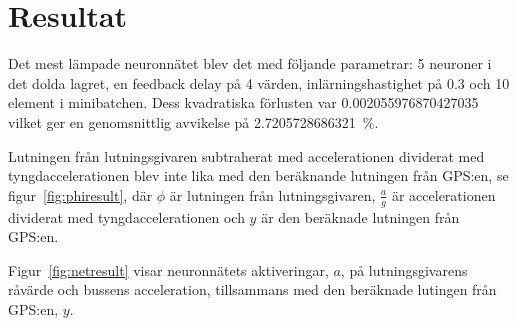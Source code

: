 \section{Resultat}

Det mest lämpade neuronnätet blev det med följande parametrar:
\SI{5}{\styck} neuroner i det dolda lagret, en feedback delay på \SI{4}{\styck} värden,
inlärningshastighet på \num{0.3} och \SI{10}{\styck} element i minibatchen.
Dess kvadratiska förlusten var \num[round-precision=3]{0.002055976870427035}
vilket ger en genomsnittlig avvikelse på
\SI[round-precision=3]{2.7205728686321}{\percent}.

Lutningen från lutningsgivaren subtraherat med accelerationen dividerat med tyngdaccelerationen
blev inte lika med den beräknande lutningen från GPS:en, se figur~\ref{fig:phiresult},
där $\phi$ är lutningen från lutningsgivaren,
$\frac{a}{g}$ är accelerationen dividerat med tyngdaccelerationen
och $y$ är den beräknade lutningen från GPS:en.

\begin{sidewaysfigure}
	\centering
	\caption{$\phi$ och $\frac{a}{g}$ som funktioner av tiden konkatenerade från 7 loggar och kontrasterade mot den beräknade lutningen från GPS:en. \label{fig:phiresult}}
\end{sidewaysfigure}

Figur~\ref{fig:netresult} visar neuronnätets aktiveringar, $a$, på
lutningsgivarens råvärde och bussens acceleration,
tillsammans med den beräknade lutingen från GPS:en, $y$.


